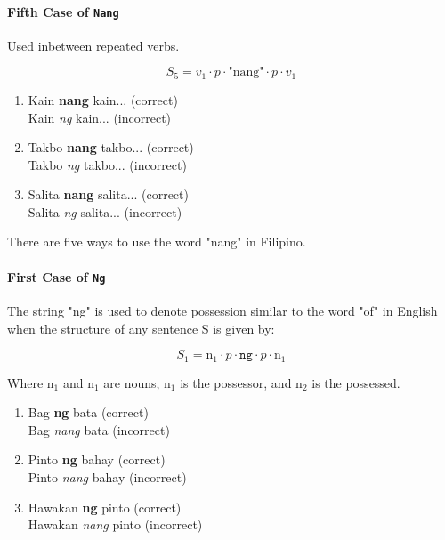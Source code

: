 \paragraph{Fifth Case of \texttt{Nang}} Used inbetween repeated verbs.

\[
      S_5 = v_1 \cdot p \cdot \text{"nang"} \cdot p \cdot v_1
\]

\begin{example}

\end{example}

\begin{enumerate}
      \item Kain \textbf{nang} kain... (correct)
            \\ Kain \textit{ng} kain... (incorrect)
      \item Takbo \textbf{nang} takbo... (correct)
            \\ Takbo \textit{ng} takbo... (incorrect)
      \item Salita \textbf{nang} salita... (correct)
            \\ Salita \textit{ng} salita... (incorrect)
\end{enumerate}

There are five ways to use the word "nang" in Filipino.

\paragraph{First Case of \texttt{Ng}} The string "ng" is used to denote possession similar to
the word "of" in English when the structure of any sentence S is given by:

\[
      S_1 = \text{n}_1 \cdot p \cdot \texttt{ng} \cdot p \cdot \text{n}_1
\]

Where n$_1$ and n$_1$ are nouns,  n$_1$ is the possessor, and n$_2$ is the possessed.

\begin{example}
\end{example}

\begin{enumerate}
      \item Bag \textbf{ng} bata (correct)
            \\ Bag \textit{nang} bata (incorrect)
      \item Pinto \textbf{ng} bahay (correct)
            \\ Pinto \textit{nang} bahay (incorrect)
      \item Hawakan \textbf{ng} pinto (correct)
            \\ Hawakan \textit{nang} pinto (incorrect)
\end{enumerate}

